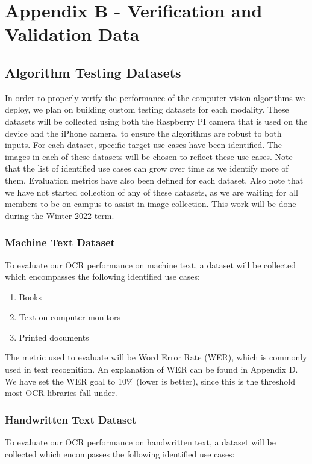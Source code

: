 \documentclass[a4paper,11pt]{article}
\begin{document}
\newpage
\section{Appendix B - Verification and Validation Data}

\subsection{Algorithm Testing Datasets}
In order to properly verify the performance of the computer vision algorithms we deploy, we plan on building custom testing datasets for each modality. These datasets will be collected using both the Raspberry PI camera that is used on the device and the iPhone camera, to ensure the algorithms are robust to both inputs. For each dataset, specific target use cases have been identified. The images in each of these datasets will be chosen to reflect these use cases. Note that the list of identified use cases can grow over time as we identify more of them. Evaluation metrics have also been defined for each dataset. Also note that we have not started collection of any of these datasets, as we are waiting for all members to be on campus to assist in image collection. This work will be done during the Winter 2022 term.

\subsubsection{Machine Text Dataset}
To evaluate our OCR performance on machine text, a dataset will be collected which encompasses the following identified use cases:

\begin{enumerate}
    \item Books
    \item Text on computer monitors
    \item Printed documents
\end{enumerate}

The metric used to evaluate will be Word Error Rate (WER), which is commonly used in text recognition. An explanation of WER can be found in Appendix D. We have set the WER goal to 10\% (lower is better), since this is the threshold most OCR libraries fall under.

\subsubsection{Handwritten Text Dataset}
To evaluate our OCR performance on handwritten text, a dataset will be collected which encompasses the following identified use cases:
\end{document}
